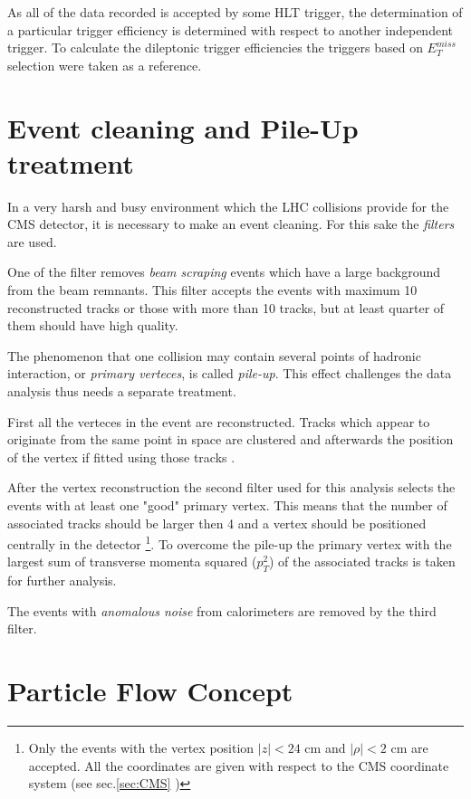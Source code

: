As all of the data recorded is accepted by some HLT trigger, the determination of a particular trigger efficiency is determined with 
respect to another independent trigger. To calculate the dileptonic trigger efficiencies the triggers based on $E_{T}^{miss}$ selection
were taken as a reference.


\section{Event cleaning and Pile-Up treatment}

In a very harsh and busy environment which the LHC collisions provide for the CMS detector, it is necessary to make an event 
cleaning. For this sake the \textit{filters} are used.

One of the filter removes \textit{beam scraping} events which have a large background from the beam remnants. This filter accepts 
the events with maximum 10 reconstructed tracks or those with more than 10 tracks, but at least quarter of them should have
high quality.

The phenomenon that one collision may contain several points of hadronic interaction, or \textit{primary verteces}, is called \textit{pile-up}. 
This effect challenges the data analysis thus needs a separate treatment. 

First all the verteces in the event are reconstructed.
Tracks which appear to originate from the same point in space are clustered and afterwards the position of the vertex if fitted using those tracks \cite{TrackPerf}.

After the vertex reconstruction the second filter used for this analysis selects the events with at least one "good" primary vertex.
This means that the number of associated tracks should be larger then 4 and a vertex should be positioned centrally in the detector
\footnote{Only the events with the vertex position $|z| < \textrm{24 cm}$ and $|\rho| < \textrm{2 cm}$ are accepted. All the coordinates
are given with respect to the CMS coordinate system (see sec.\ref{sec:CMS} )}. To overcome the pile-up the primary vertex with the 
largest sum of transverse momenta squared ($p_{T}^{2}$) of the associated tracks is taken for further analysis.

The events with \textit{anomalous noise} from calorimeters are removed by the third filter.


\section{Particle Flow Concept}\label{sec:PF}

